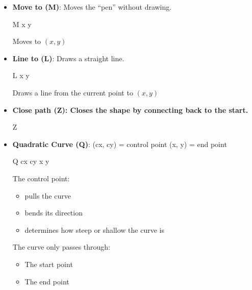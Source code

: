 \documentclass{report}
\begin{document}
\begin{itemize}
            \begin{itemize}
                \item \textbf{Move to (M)}: Moves the “pen” without drawing.
                    \bigbreak \noindent 
                    \begin{center}
                        M x y
                    \end{center}
                    Moves to $(x,y)$
                \item \textbf{Line to (L)}: Draws a straight line.
                    \bigbreak \noindent 
                    \begin{center}
                        L x y
                    \end{center}
                    Draws a line from the current point to $(x,y)$
                \item \textbf{Close path (Z): Closes the shape by connecting back to the start.}
                    \bigbreak \noindent 
                    \begin{center}
                        Z
                    \end{center}
                \item \textbf{Quadratic Curve (Q)}: (cx, cy) = control point (x, y) = end point
                    \bigbreak \noindent 
                    \begin{center}
                        Q cx cy x y
                    \end{center}
                    The control point:
                    \begin{itemize}
                        \item pulls the curve
                        \item bends its direction
                        \item determines how steep or shallow the curve is
                    \end{itemize}
                    The curve only passes through:
                    \begin{itemize}
                        \item The start point
                        \item The end point
                    \end{itemize}


\end{itemize}
\end{itemize}
\end{document}
